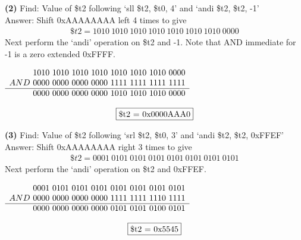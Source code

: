 \documentclass[11pt]{article}
\renewcommand\part[1]{\vspace{.10in}\textbf{(#1)}}
\newenvironment{centermath}
 {\begin{center}$\displaystyle}
 {$\end{center}}
\begin{document}
\part{2}
Find: Value of \$t2 following `sll \$t2, \$t0, 4' and `andi \$t2, \$t2, -1' \\
\vspace{5mm}
Answer: Shift 0xAAAAAAAA left 4 times to give
\begin{gather*}
\$t2 = 1010 \ 1010 \ 1010 \ 1010 \ 1010 \ 1010 \ 1010 \ 0000
\end{gather*}
Next perform the `andi' operation on \$t2 and -1. Note that AND immediate for -1 is a zero extended 0xFFFF. \\
\vspace{5mm}
\begin{centermath}
\begin{array}[t]{r}
    1010 \ 1010 \ 1010 \ 1010 \ 1010 \ 1010 \ 1010 \ 0000 \\
AND \ 0000\ 0000\ 0000\ 0000\ 1111\ 1111\ 1111\ 1111 \\ \hline
   \ 0000\ 0000\ 0000\ 0000\ 1010\ 1010\ 1010\ 0000
\end{array} 
\end{centermath}
\begin{gather*}
\fbox{\$t2 = 0x0000AAA0}
\end{gather*}

\part{3}
Find: Value of \$t2 following `srl \$t2, \$t0, 3' and `andi \$t2, \$t2, 0xFFEF' \\
\vspace{5mm}
Answer: Shift 0xAAAAAAAA right 3 times to give
\begin{gather*}
\$t2 = 0001 \ 0101 \ 0101 \ 0101 \ 0101 \ 0101 \ 0101 \ 0101
\end{gather*}
Next perform the `andi' operation on \$t2 and 0xFFEF. \\
\vspace{5mm}
\begin{centermath}
\begin{array}[t]{r}
    0001 \ 0101 \ 0101 \ 0101 \ 0101 \ 0101 \ 0101 \ 0101 \\
AND \ 0000\ 0000\ 0000\ 0000\ 1111\ 1111\ 1110\ 1111 \\ \hline
   \ 0000\ 0000\ 0000\ 0000\ 0101\ 0101\ 0100\ 0101
\end{array} 
\end{centermath}
\begin{gather*}
\fbox{\$t2 = 0x5545}
\end{gather*}
\end{document}
